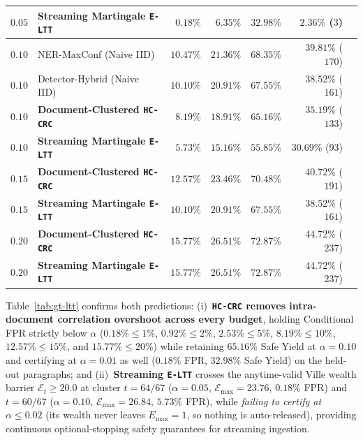 \documentclass{article}
\begin{document}
\begin{table}[t]
\begin{center}
{\begin{tabular}{llrrrrr}
$0.05$ & \textbf{Streaming Martingale \texttt{E-LTT}} & $\mathbf{0.18\%}$ & $\mathbf{6.35\%}$ & $\mathbf{32.98\%}$ & $\mathbf{2.36\%}$ ($3$) \\
\midrule
$0.10$ & NER-MaxConf (Naive IID) & $10.47\%$ & $21.36\%$ & $68.35\%$ & $39.81\%$ ($170$) \\
$0.10$ & Detector-Hybrid (Naive IID) & $10.10\%$ & $20.91\%$ & $67.55\%$ & $38.52\%$ ($161$) \\
$0.10$ & \textbf{Document-Clustered \texttt{HC-CRC}} & $\mathbf{8.19\%}$ & $\mathbf{18.91\%}$ & $\mathbf{65.16\%}$ & $\mathbf{35.19\%}$ ($133$) \\
$0.10$ & \textbf{Streaming Martingale \texttt{E-LTT}} & $\mathbf{5.73\%}$ & $\mathbf{15.16\%}$ & $\mathbf{55.85\%}$ & $\mathbf{30.69\%}$ ($93$) \\
\midrule
$0.15$ & \textbf{Document-Clustered \texttt{HC-CRC}} & $\mathbf{12.57\%}$ & $\mathbf{23.46\%}$ & $\mathbf{70.48\%}$ & $\mathbf{40.72\%}$ ($191$) \\
$0.15$ & \textbf{Streaming Martingale \texttt{E-LTT}} & $\mathbf{10.10\%}$ & $\mathbf{20.91\%}$ & $\mathbf{67.55\%}$ & $\mathbf{38.52\%}$ ($161$) \\
\midrule
$0.20$ & \textbf{Document-Clustered \texttt{HC-CRC}} & $\mathbf{15.77\%}$ & $\mathbf{26.51\%}$ & $\mathbf{72.87\%}$ & $\mathbf{44.72\%}$ ($237$) \\
$0.20$ & \textbf{Streaming Martingale \texttt{E-LTT}} & $\mathbf{15.77\%}$ & $\mathbf{26.51\%}$ & $\mathbf{72.87\%}$ & $\mathbf{44.72\%}$ ($237$) \\
\bottomrule
\end{tabular}%
}
\end{center}
\vskip -0.14in
\end{table}

Table~\ref{tab:gt-ltt} confirms both predictions: (i)~\textbf{\texttt{HC-CRC} removes intra-document correlation overshoot across every budget}, holding Conditional FPR strictly below $\alpha$ ($0.18\% \le 1\%$, $0.92\% \le 2\%$, $2.53\% \le 5\%$, $8.19\% \le 10\%$, $12.57\% \le 15\%$, and $15.77\% \le 20\%$) while retaining $65.16\%$ Safe Yield at $\alpha{=}0.10$ and certifying at $\alpha{=}0.01$ as well ($0.18\%$ FPR, $32.98\%$ Safe Yield) on the held-out paragraphs; and (ii)~\textbf{Streaming \texttt{E-LTT}} crosses the anytime-valid Ville wealth barrier $\mathcal{E}_t \ge 20.0$ at cluster $t{=}64/67$ ($\alpha{=}0.05$, $\mathcal{E}_{\max}{=}23.76$, $0.18\%$ FPR) and $t{=}60/67$ ($\alpha{=}0.10$, $\mathcal{E}_{\max}{=}26.84$, $5.73\%$ FPR), while \emph{failing to certify at $\alpha \le 0.02$} (its wealth never leaves $E_{\max}{=}1$, so nothing is auto-released), providing continuous optional-stopping safety guarantees for streaming ingestion.
\end{document}
